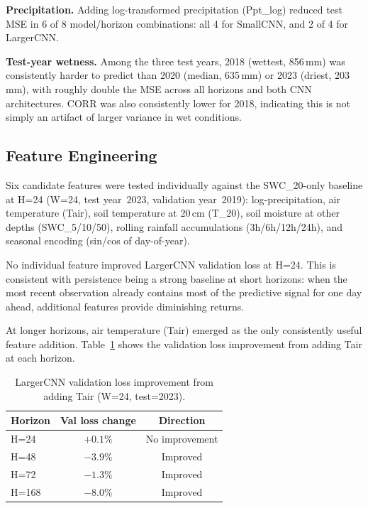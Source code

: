 \documentclass[11pt]{article}
\begin{document}
\textbf{Precipitation.} Adding log-transformed precipitation (Ppt\_log) reduced test
MSE in 6 of 8 model/horizon combinations: all 4 for SmallCNN, and 2 of 4 for
LargerCNN.

\textbf{Test-year wetness.} Among the three test years, 2018 (wettest, 856\,mm) was
consistently harder to predict than 2020 (median, 635\,mm) or 2023 (driest,
203\,mm), with roughly double the MSE across all horizons and both CNN architectures.
CORR was also consistently lower for 2018, indicating this is not simply an artifact
of larger variance in wet conditions.

\subsection{Feature Engineering}

Six candidate features were tested individually against the SWC\_20-only baseline at
H=24 (W=24, test year~2023, validation year~2019): log-precipitation, air temperature
(Tair), soil temperature at 20\,cm (T\_20), soil moisture at other depths
(SWC\_5/10/50), rolling rainfall accumulations (3h/6h/12h/24h), and seasonal encoding
(sin/cos of day-of-year).

No individual feature improved LargerCNN validation loss at H=24. This is consistent
with persistence being a strong baseline at short horizons: when the most recent
observation already contains most of the predictive signal for one day ahead,
additional features provide diminishing returns.

At longer horizons, air temperature (Tair) emerged as the only consistently useful
feature addition. Table~\ref{tab:feature_horizon} shows the validation loss
improvement from adding Tair at each horizon.

\begin{table}[h]
\centering
\caption{LargerCNN validation loss improvement from adding Tair (W=24, test=2023).}
\label{tab:feature_horizon}
\begin{tabular}{lcc}
\toprule
\textbf{Horizon} & \textbf{Val loss change} & \textbf{Direction} \\
\midrule
H=24  & $+0.1\%$  & No improvement \\
H=48  & $-3.9\%$  & Improved \\
H=72  & $-1.3\%$  & Improved \\
H=168 & $-8.0\%$  & Improved \\
\bottomrule
\end{tabular}
\end{table}
\end{document}
